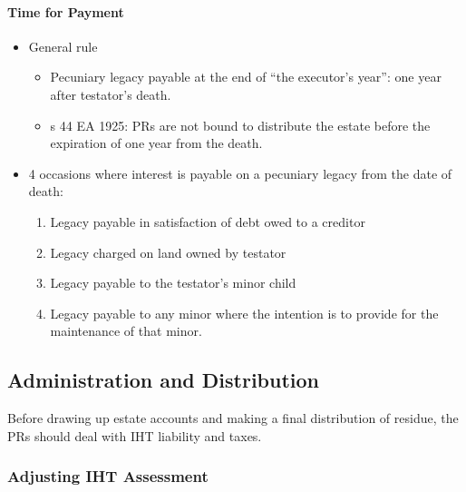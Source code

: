 \documentclass[
]{article}
\providecommand{\tightlist}{%
  \setlength{\itemsep}{0pt}\setlength{\parskip}{0pt}}
\begin{document}
\hypertarget{time-for-payment-1}{%
\paragraph{Time for Payment}\label{time-for-payment-1}}

\begin{itemize}
\tightlist
\item
  General rule

  \begin{itemize}
  \tightlist
  \item
    Pecuniary legacy payable at the end of ``the executor's year'': one
    year after testator's death.
  \item
    s 44 EA 1925: PRs are not bound to distribute the estate before the
    expiration of one year from the death.
  \end{itemize}
\item
  4 occasions where interest is payable on a pecuniary legacy from the
  date of death:

  \begin{enumerate}
  \def\labelenumi{\arabic{enumi}.}
  \tightlist
  \item
    Legacy payable in satisfaction of debt owed to a creditor
  \item
    Legacy charged on land owned by testator
  \item
    Legacy payable to the testator's minor child
  \item
    Legacy payable to any minor where the intention is to provide for
    the maintenance of that minor.
  \end{enumerate}
\end{itemize}

\hypertarget{administration-and-distribution}{%
\subsection{Administration and
Distribution}\label{administration-and-distribution}}

Before drawing up estate accounts and making a final distribution of
residue, the PRs should deal with IHT liability and taxes.

\hypertarget{adjusting-iht-assessment}{%
\subsubsection{Adjusting IHT
Assessment}\label{adjusting-iht-assessment}}
\end{document}
